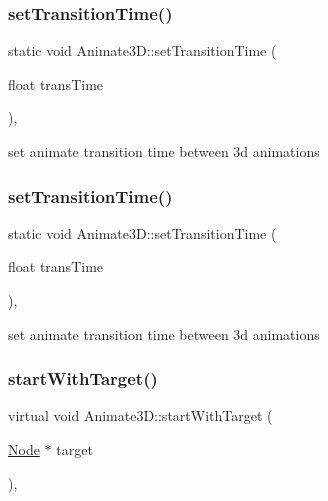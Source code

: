 \subsubsection{\texorpdfstring{set\+Transition\+Time()}{setTransitionTime()}\hspace{0.1cm}{\footnotesize\ttfamily [1/2]}}
{\footnotesize\ttfamily static void Animate3\+D\+::set\+Transition\+Time (\begin{DoxyParamCaption}\item[{float}]{trans\+Time }\end{DoxyParamCaption})\hspace{0.3cm}{\ttfamily [inline]}, {\ttfamily [static]}}

set animate transition time between 3d animations \mbox{\label{classAnimate3D_aba0ac7ebee334d4348a945c781a12a66}} 
\subsubsection{\texorpdfstring{set\+Transition\+Time()}{setTransitionTime()}\hspace{0.1cm}{\footnotesize\ttfamily [2/2]}}
{\footnotesize\ttfamily static void Animate3\+D\+::set\+Transition\+Time (\begin{DoxyParamCaption}\item[{float}]{trans\+Time }\end{DoxyParamCaption})\hspace{0.3cm}{\ttfamily [inline]}, {\ttfamily [static]}}

set animate transition time between 3d animations \mbox{\label{classAnimate3D_a684fa4c9666a80e949c45356e1c1961f}} 
\subsubsection{\texorpdfstring{start\+With\+Target()}{startWithTarget()}}
{\footnotesize\ttfamily virtual void Animate3\+D\+::start\+With\+Target (\begin{DoxyParamCaption}\item[{\hyperlink{classNode}{Node} $\ast$}]{target }\end{DoxyParamCaption})\hspace{0.3cm}{\ttfamily [override]}, {\ttfamily [virtual]}}


